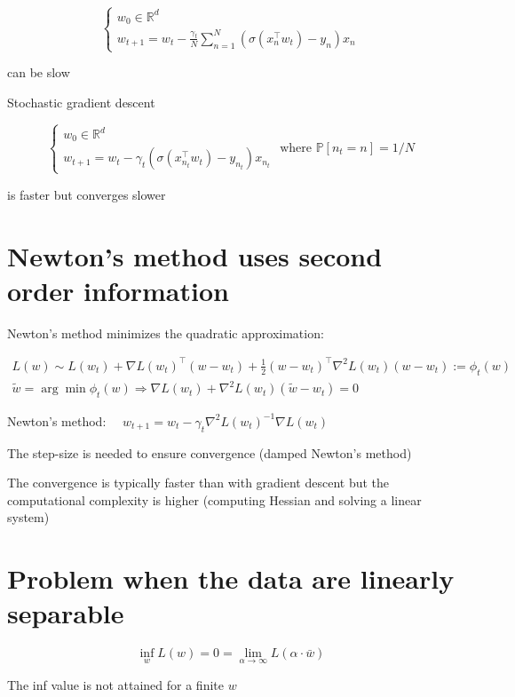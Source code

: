 \documentclass[10pt]{article}
\begin{document}
$$
\left\{\begin{array}{l}
w_{0} \in \mathbb{R}^{d} \\
w_{t+1}=w_{t}-\frac{\gamma_{t}}{N} \sum_{n=1}^{N}\left(\sigma\left(x_{n}^{\top} w_{t}\right)-y_{n}\right) x_{n}
\end{array}\right.
$$

can be slow

Stochastic gradient descent

$$
\left\{\begin{array}{l}
w_{0} \in \mathbb{R}^{d} \\
w_{t+1}=w_{t}-\gamma_{t}\left(\sigma\left(x_{n_{t}}^{\top} w_{t}\right)-y_{n_{t}}\right) x_{n_{t}}
\end{array} \text { where } \mathbb{P}\left[n_{t}=n\right]=1 / N\right.
$$

is faster but converges slower

\section*{Newton's method uses second order information}
Newton's method minimizes the quadratic approximation:

$$
\begin{gathered}
L(w) \sim L\left(w_{t}\right)+\nabla L\left(w_{t}\right)^{\top}\left(w-w_{t}\right)+\frac{1}{2}\left(w-w_{t}\right)^{\top} \nabla^{2} L\left(w_{t}\right)\left(w-w_{t}\right):=\phi_{t}(w) \\
\tilde{w}=\arg \min \phi_{t}(w) \Longrightarrow \nabla L\left(w_{t}\right)+\nabla^{2} L\left(w_{t}\right)\left(\tilde{w}-w_{t}\right)=0
\end{gathered}
$$

Newton's method: $\quad w_{t+1}=w_{t}-\gamma_{t} \nabla^{2} L\left(w_{t}\right)^{-1} \nabla L\left(w_{t}\right)$

The step-size is needed to ensure convergence (damped Newton's method)

The convergence is typically faster than with gradient descent but the computational complexity is higher (computing Hessian and solving a linear system)

\section*{Problem when the data are linearly separable}
$$
\inf _{w} L(w)=0=\lim _{\alpha \rightarrow \infty} L(\alpha \cdot \bar{w})
$$

The inf value is not attained for a finite $w$
\end{document}
